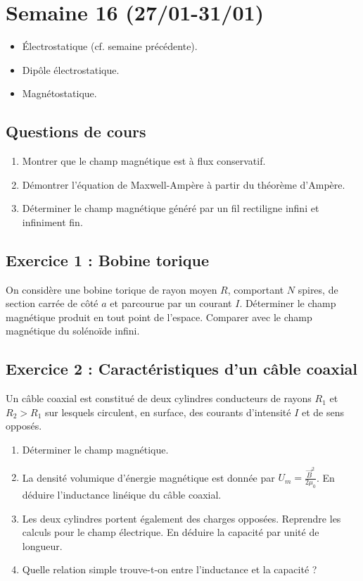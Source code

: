 \section{Semaine 16 (27/01-31/01)}


\begin{itemize}
	\item Électrostatique (cf. semaine précédente).
	\item Dipôle électrostatique.
	\item Magnétostatique.
\end{itemize}

\subsection{Questions de cours}
\begin{enumerate}
	\item Montrer que le champ magnétique est à flux conservatif. 
	\item Démontrer l'équation de Maxwell-Ampère à partir du théorème d'Ampère.
	\item Déterminer le champ magnétique généré par un fil rectiligne infini et infiniment fin.
\end{enumerate}


\subsection{Exercice 1 : Bobine torique}

On considère une bobine torique de rayon moyen $R$, comportant $N$ spires, de section carrée de côté $a$ et parcourue par un courant $I$. Déterminer le champ magnétique produit en tout point de l'espace. Comparer avec le champ magnétique du solénoïde infini.

\subsection{Exercice 2 : Caractéristiques d'un câble coaxial}

Un câble coaxial est constitué de deux cylindres conducteurs de rayons $R_1$ et $R_2 > R_1$ sur lesquels circulent, en surface, des courants d'intensité $I$ et de sens opposés.

\begin{enumerate}
	\item Déterminer le champ magnétique.
	\item La densité volumique d'énergie magnétique est donnée par $U_m = \frac{\vec{B}^2}{2 \mu_0}$. En déduire l'inductance linéique du câble coaxial.
	\item Les deux cylindres portent également des charges opposées. Reprendre les calculs pour le champ électrique. En déduire la capacité par unité de longueur.
	\item Quelle relation simple trouve-t-on entre l'inductance et la capacité ?
\end{enumerate}

